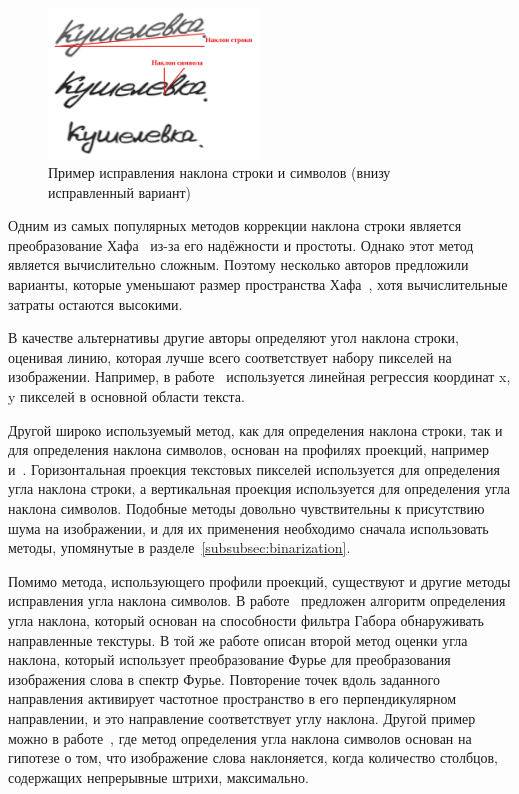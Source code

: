 \begin{figure}[h!]
    \centering
    \includegraphics[width=0.5\textwidth]{img/slant-slope}
    \caption{Пример исправления наклона строки и символов (внизу исправленный вариант)}
    \label{fig:slope-slant}
\end{figure}

Одним из самых популярных методов коррекции наклона строки является преобразование Хафа~\cite{duda1972use} из-за его надёжности и простоты.
Однако этот метод является вычислительно сложным.
Поэтому несколько авторов предложили варианты, которые уменьшают размер пространства Хафа~\cite{pal1996improved,boukharouba2017new}, хотя вычислительные затраты остаются высокими.

В качестве альтернативы другие авторы определяют угол наклона строки, оценивая линию, которая лучше всего соответствует набору пикселей на изображении.
Например, в работе~\cite{gupta2014efficient} используется линейная регрессия координат x, y пикселей в основной области текста.

Другой широко используемый метод, как для определения наклона строки, так и для определения наклона символов, основан на профилях проекций, например~\cite{kavallieratou2002skew} и~\cite{pastor2004projection}.
Горизонтальная проекция текстовых пикселей используется для определения угла наклона строки, а вертикальная проекция используется для определения угла наклона символов.
Подобные методы довольно чувствительны к присутствию шума на изображении, и для их применения необходимо сначала использовать методы, упомянутые в разделе~\ref{subsubsec:binarization}.

Помимо метода, использующего профили проекций, существуют и другие методы исправления угла наклона символов.
В работе~\cite{gupta2012novel} предложен алгоритм определения угла наклона, который основан на способности фильтра Габора обнаруживать направленные текстуры.
В той же работе описан второй метод оценки угла наклона, который использует преобразование Фурье для преобразования изображения слова в спектр Фурье.
Повторение точек вдоль заданного направления активирует частотное пространство в его перпендикулярном направлении, и это направление соответствует углу наклона.
Другой пример можно в работе~\cite{vinciarelli2001new}, где метод определения угла наклона символов основан на гипотезе о том,
что изображение слова наклоняется, когда количество столбцов, содержащих непрерывные штрихи, максимально.


